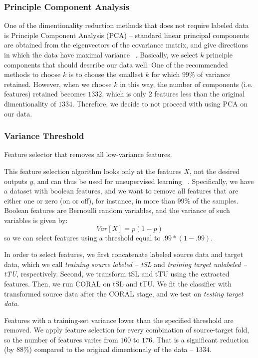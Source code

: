\subsubsection{Principle Component Analysis}
One of the dimentionality reduction methods that does not require labeled data is Principle Component Analysis (PCA) -- standard linear principal components are obtained from the eigenvectors of the covariance matrix, and give directions in which the data have maximal variance ~\citep{hastie}. Basically, we select $k$ principle components that should describe our data well. One of the recommended methods to choose $k$ is to choose the smallest $k$ for which $99\%$ of variance retained. However, when we choose $k$ in this way, the number of components (i.e. features) retained becomes $1332$, which is only $2$ features less than the original dimentionality of $1334$. Therefore, we decide to not proceed with using PCA on our data.

\subsubsection{Variance Threshold}
\label{varthressub}

Feature selector that removes all low-variance features. 

This feature selection algorithm looks only at the features $X$, not the desired outputs $y$, and can thus be used for unsupervised learning ~\citep{varthres}. Specifically, we have a dataset with boolean features, and we want to remove all features that are either one or zero (on or off), for instance, in more than $99\%$ of the samples. Boolean features are Bernoulli random variables, and the variance of such variables is given by: \[ Var[X] = p(1-p)\] so we can select features using a threshold equal to $.99 * (1 - .99)$.

In order to select features, we first concatenate labeled source data and target data, which we call \textit{training source labeled -- tSL} and \textit{training target unlabeled -- tTU}, respectively. Second, we transform tSL and tTU using the extracted features. Then, we run CORAL on tSL and tTU. We fit the classifier with transformed source data after the CORAL stage, and we test on \textit{testing target data}.

Features with a training-set variance lower than the specified threshold are removed. We apply feature selection for every combination of source-target fold, so the number of features varies from $160$ to $176$. That is a significant reduction (by $88\%$) compared to the original dimentionaly of the data -- $1334$. 

